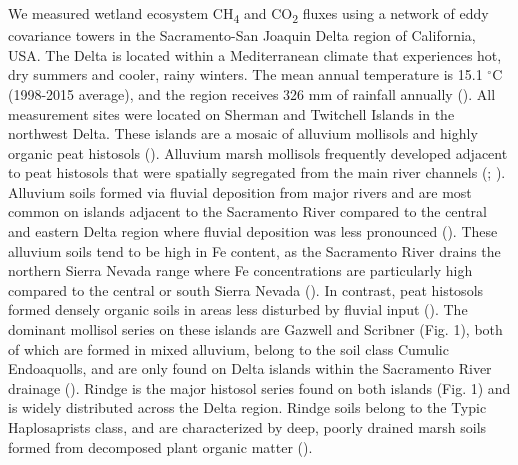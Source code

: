 \documentclass[
  12pt,
]{article}
\begin{document}
We measured wetland ecosystem CH\textsubscript{4} and
CO\textsubscript{2} fluxes using a network of eddy covariance towers in
the Sacramento-San Joaquin Delta region of California, USA. The Delta is
located within a Mediterranean climate that experiences hot, dry summers
and cooler, rainy winters. The mean annual temperature is 15.1
\(^\circ\)C (1998-2015 average), and the region receives 326 mm of
rainfall annually (). All measurement sites were located on Sherman and
Twitchell Islands in the northwest Delta. These islands are a mosaic of
alluvium mollisols and highly organic peat histosols
(). Alluvium marsh
mollisols frequently developed adjacent to peat histosols that were
spatially segregated from the main river channels
(;
). Alluvium
soils formed via fluvial deposition from major rivers and are most
common on islands adjacent to the Sacramento River compared to the
central and eastern Delta region where fluvial deposition was less
pronounced (). These alluvium soils tend to be high in Fe content, as the
Sacramento River drains the northern Sierra Nevada range where Fe
concentrations are particularly high compared to the central or south
Sierra Nevada ().
In contrast, peat histosols formed densely organic soils in areas less
disturbed by fluvial input (). The dominant mollisol series on these islands are
Gazwell and Scribner (Fig. 1), both of which are formed in mixed
alluvium, belong to the soil class Cumulic Endoaquolls, and are only
found on Delta islands within the Sacramento River drainage
(). Rindge is the
major histosol series found on both islands (Fig. 1) and is widely
distributed across the Delta region. Rindge soils belong to the Typic
Haplosaprists class, and are characterized by deep, poorly drained marsh
soils formed from decomposed plant organic matter
().
\end{document}
